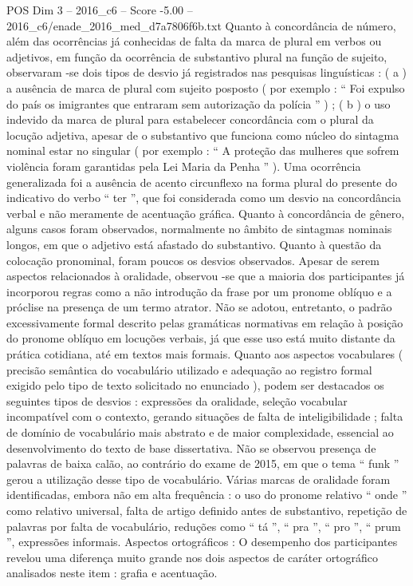 \begin{textsample}{POS Dim 3 – 2016\_c6 – Score -5.00 – 2016\_c6/enade\_2016\_med\_d7a7806f6b.txt}
Quanto à concordância de número, além das ocorrências já conhecidas de falta da marca de plural em verbos ou adjetivos, em função da ocorrência de substantivo plural na função de sujeito, observaram -se dois tipos de desvio já registrados nas pesquisas linguísticas : ( a ) a ausência de marca de plural com sujeito posposto ( por exemplo : “ Foi expulso do país os imigrantes que entraram sem autorização da polícia ” ) ; ( b ) o uso indevido da marca de plural para estabelecer concordância com o plural da locução adjetiva, apesar de o substantivo que funciona como núcleo do sintagma nominal estar no singular ( por exemplo : “ A proteção das mulheres que sofrem violência foram garantidas pela Lei Maria da Penha ” ).
Uma ocorrência generalizada foi a ausência de acento circunflexo na forma plural do presente do indicativo do verbo “ ter ”, que foi considerada como um desvio na concordância verbal e não meramente de acentuação gráfica.
Quanto à concordância de gênero, alguns casos foram observados, normalmente no âmbito de sintagmas nominais longos, em que o adjetivo está afastado do substantivo.
Quanto à questão da colocação pronominal, foram poucos os desvios observados.
Apesar de serem aspectos relacionados à oralidade, observou -se que a maioria dos participantes já incorporou regras como a não introdução da frase por um pronome oblíquo e a próclise na presença de um termo atrator.
Não se adotou, entretanto, o padrão excessivamente formal descrito pelas gramáticas normativas em relação à posição do pronome oblíquo em locuções verbais, já que esse uso está muito distante da prática cotidiana, até em textos mais formais.
Quanto aos aspectos vocabulares ( precisão semântica do vocabulário utilizado e adequação ao registro formal exigido pelo tipo de texto solicitado no enunciado ), podem ser destacados os seguintes tipos de desvios : expressões da oralidade, seleção vocabular incompatível com o contexto, gerando situações de falta de inteligibilidade ; falta de domínio de vocabulário mais abstrato e de maior complexidade, essencial ao desenvolvimento do texto de base dissertativa.
Não se observou presença de palavras de baixa calão, ao contrário do exame de 2015, em que o tema “ funk ” gerou a utilização desse tipo de vocabulário.
Várias marcas de oralidade foram identificadas, embora não em alta frequência : o uso do pronome relativo “ onde ” como relativo universal, falta de artigo definido antes de substantivo, repetição de palavras por falta de vocabulário, reduções como “ tá ”, “ pra ”, “ pro ”, “ prum ”, expressões informais.
Aspectos ortográficos : O desempenho dos participantes revelou uma diferença muito grande nos dois aspectos de caráter ortográfico analisados neste item : grafia e acentuação.

\end{textsample}

